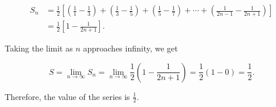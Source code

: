 \begin{align*}
S_n &= \frac{1}{2} \left[ \left( \frac{1}{1} - \frac{1}{3} \right) + \left( \frac{1}{3} - \frac{1}{5} \right) + \left( \frac{1}{5} - \frac{1}{7} \right) + \cdots + \left( \frac{1}{2n - 1} - \frac{1}{2n + 1} \right) \right] \\
&= \frac{1}{2} \left[ 1 - \frac{1}{2n + 1} \right].
\end{align*}

Taking the limit as \(n\) approaches infinity, we get

\[
S = \lim_{n \to \infty} S_n = \lim_{n \to \infty} \frac{1}{2} \left( 1 - \frac{1}{2n + 1} \right) = \frac{1}{2} (1 - 0) = \frac{1}{2}.
\]

Therefore, the value of the series is \(\frac{1}{2}\).
